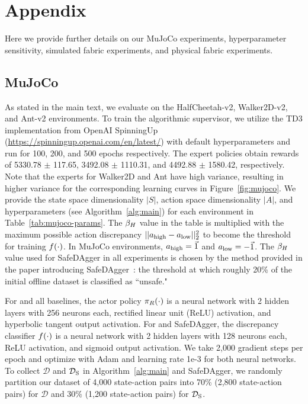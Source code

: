 \normalsize
\section{Appendix}
\label{sec:appendix}
Here we provide further details on our MuJoCo experiments, hyperparameter sensitivity, simulated fabric experiments, and physical fabric experiments.

\subsection{MuJoCo}\label{ssec:mujoco-appdx}
As stated in the main text, we evaluate on the HalfCheetah-v2, Walker2D-v2, and Ant-v2 environments. To train the algorithmic supervisor, we utilize the TD3 implementation from OpenAI SpinningUp (\url{https://spinningup.openai.com/en/latest/}) with default hyperparameters and run for 100, 200, and 500 epochs respectively. The expert policies obtain rewards of 5330.78 $\pm$ 117.65, 3492.08 $\pm$ 1110.31, and 4492.88 $\pm$ 1580.42, respectively. Note that the experts for Walker2D and Ant have high variance, resulting in higher variance for the corresponding learning curves in Figure~\ref{fig:mujoco}. We provide the state space dimensionality $|S|$, action space dimensionality $|A|$, and \algabbr hyperparameters (see Algorithm~\ref{alg:main}) for each environment in Table~\ref{tab:mujoco-params}. The $\beta_{H}$ value in the table is multiplied with the maximum possible action discrepancy $||a_{\rm high} - a_{\rm low}||_2^2$ to become the threshold for training $f(\cdot)$. In MuJoCo environments, $a_{\rm high} = \vec 1$ and $a_{\rm low} = -\vec 1$. The $\beta_{H}$ value used for SafeDAgger in all experiments is chosen by the method provided in the paper introducing SafeDAgger~\cite{safe_dagger}: the threshold at which roughly 20\% of the initial offline dataset is classified as ``unsafe."

For \algabbr and all baselines, the actor policy $\pi_{R}(\cdot)$ is a neural network with 2 hidden layers with 256 neurons each, rectified linear unit (ReLU) activation, and hyperbolic tangent output activation. For \algabbr and SafeDAgger, the discrepancy classifier $f(\cdot)$ is a neural network with 2 hidden layers with 128 neurons each, ReLU activation, and sigmoid output activation. We take 2,000 gradient steps per epoch and optimize with Adam and learning rate 1e-3 for both neural networks. To collect $\mathcal{D}$ and $\mathcal{D}_{\rm S}$ in Algorithm~\ref{alg:main} and SafeDAgger, we randomly partition our dataset of 4,000 state-action pairs into 70\% (2,800 state-action pairs) for $\mathcal{D}$ and 30\% (1,200 state-action pairs) for $\mathcal{D}_{\rm S}$.


